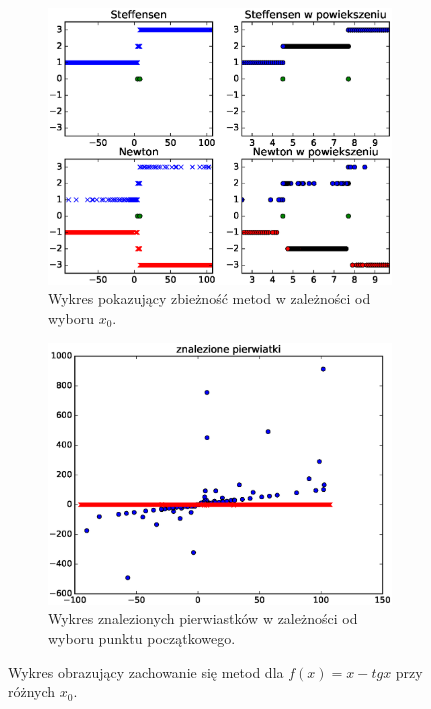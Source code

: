 \documentclass{article}
\begin{document}
\begin{figure}[H]
    \centering
    \begin{subfigure}[H]{0.9\textwidth}
        \includegraphics[width=\textwidth]{figure_5.eps}
        \caption{Wykres pokazujący zbieżność metod w zależności od wyboru $x_0$.}
        \label{w4a}
    \end{subfigure}
    \begin{subfigure}[H]{0.9\textwidth}
        \includegraphics[width=\textwidth]{figure_6.eps}
        \caption{Wykres znalezionych pierwiastków w zależności od wyboru punktu początkowego.}
        \label{w4b}
    \end{subfigure}
    \caption{Wykres obrazujący zachowanie się metod dla $f(x)=x-tg x$ przy różnych $x_0$.}
 	\label{w4}
\end{figure}
\end{document}
